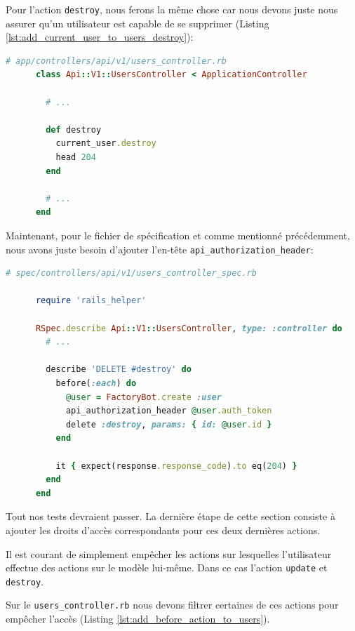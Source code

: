 \documentclass[]{report}
\begin{document}
    Pour l'action \verb|destroy|, nous ferons la même chose car nous devons juste nous assurer qu'un utilisateur est capable de se supprimer (Listing \ref{lst:add_current_user_to_users_destroy}):

    \begin{scriptsize}
      \begin{lstlisting}[language=ruby, label={lst:add_current_user_to_users_destroy}, caption={Mise à jour de l'action Users\#Destroy}]
      # app/controllers/api/v1/users_controller.rb
      class Api::V1::UsersController < ApplicationController

        # ...

        def destroy
          current_user.destroy
          head 204
        end

        # ...
      end
      \end{lstlisting}
    \end{scriptsize}

    Maintenant, pour le fichier de spécification et comme mentionné précédemment, nous avons juste besoin d'ajouter l'en-tête \verb|api_authorization_header|:

    \begin{scriptsize}
      \begin{lstlisting}[language=ruby]
      # spec/controllers/api/v1/users_controller_spec.rb

      require 'rails_helper'

      RSpec.describe Api::V1::UsersController, type: :controller do
        # ...

        describe 'DELETE #destroy' do
          before(:each) do
            @user = FactoryBot.create :user
            api_authorization_header @user.auth_token
            delete :destroy, params: { id: @user.id }
          end

          it { expect(response.response_code).to eq(204) }
        end
      end
      \end{lstlisting}
    \end{scriptsize}

    Tout nos tests devraient passer. La dernière étape de cette section consiste à ajouter les droits d'accès correspondants pour ces deux dernières actions.

    Il est courant de simplement empêcher les actions sur lesquelles l'utilisateur effectue des actions sur le modèle lui-même. Dans ce cas l'action \verb|update| et \verb|destroy|.

    Sur le \verb|users_controller.rb| nous devons filtrer certaines de ces actions pour empêcher l'accès (Listing \ref{lst:add_before_action_to_users}).
\end{document}
